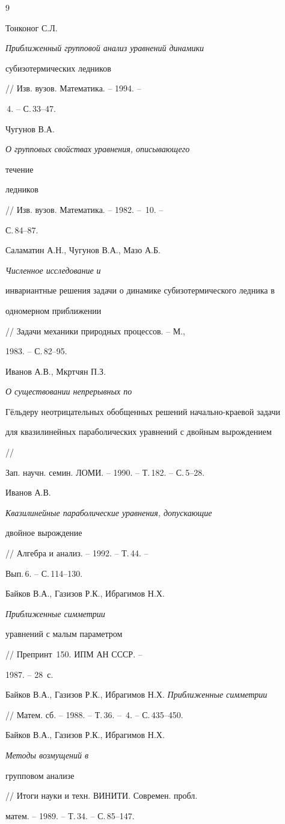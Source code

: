 \begin{thebibliography}{9}







Тонконог С.Л. {\em Приближенный групповой анализ уравнений динамики


субизотермических ледников} // Изв. вузов. Математика. -- 1994. --


\No\,4. -- С.\,33--47.




Чугунов В.А. {\em О групповых свойствах уравнения, описывающего


течение


ледников} // Изв. вузов. Математика. -- 1982. -- \No\,10. --


С.\,84--87.




Саламатин А.Н., Чугунов В.А., Мазо А.Б. {\em Численное исследование и


инвариантные решения задачи о динамике субизотермического ледника в


одномерном приближении} // Задачи механики природных процессов. -- М.,


1983. -- С.\,82--95.




Иванов А.В., Мкртчян П.З. {\em О существовании непрерывных по


Г\"ельдеру неотрицательных обобщенных решений начально-краевой задачи


для квазилинейных параболических уравнений с двойным вырождением} //


Зап. научн. семин. ЛОМИ. -- 1990. -- Т.\,182. -- С.\,5--28.




Иванов А.В. {\em Квазилинейные параболические уравнения, допускающие


двойное вырождение} // Алгебра и анализ. -- 1992. -- Т.\,44. --


Вып.\,6. -- С.\,114--130.




Байков В.А., Газизов Р.К., Ибрагимов Н.Х. {\em Приближенные симметрии


уравнений с малым параметром} // Препринт \No\,150. ИПМ АН СССР. --


1987. -- 28~с.




Байков В.А., Газизов Р.К., Ибрагимов Н.Х. {\em Приближенные симметрии}


// Матем. сб. -- 1988. -- Т.\,36. -- \No\,4. -- С.\,435--450.




Байков В.А., Газизов Р.К., Ибрагимов Н.Х. {\em Методы возмущений в


групповом анализе} // Итоги науки и техн. ВИНИТИ. Современ. пробл.


матем. -- 1989. -- Т.\,34. -- С.\,85--147.








\end{thebibliography}
